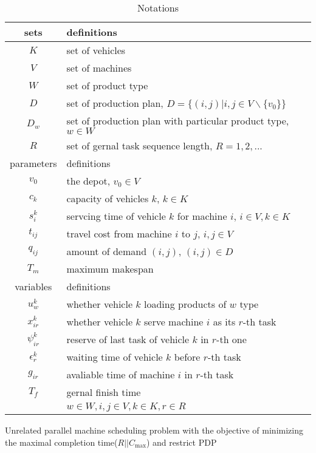 \documentclass[preprint,12pt,authoryear]{elsarticle}
\begin{document}
\begin{longtable}{cl}%
    \caption{Notations}\label{tab1}\\
    \toprule [2pt] %
    sets& definitions \\
    \midrule [1pt]  
    $K$& set of vehicles \\
    $V$& set of machines \\
    $W$& set of product type \\
    $D$& set of   production plan,
    $D=\{(i,j)|i,j\in V\backslash \{v_0\}\}$\\
    $D_w$& set of production plan with particular product type, $w \in W$ \\
    $R$& set of gernal task sequence length, $R={1,2,...}$ \\
    \midrule [1pt]     
    parameters & definitions  \\ %
    \midrule [1pt]
    $v_0$& the depot, $v_0\in V$ \\
    $c_k$& capacity of vehicles $k$, $k\in K$ \\
    $s_i^k$& servcing time of vehicle $k$ for machine $i$, $i\in V,k\in K$ \\
    $t_{ij}$& travel cost from machine $i$ to $j$, $i,j\in V$ \\ 
    $q_{ij}$& amount of demand $(i,j)$, $(i,j)\in D$ \\
    $T_m$& maximum makespan \\
    \midrule[1pt]
    variables & definitions \\
    \midrule[1pt]
    $u_w^k$& whether vehicle $k$ loading products of $w$ type \\
    $x_{ir}^k$& whether vehicle $k$ serve machine $i$ as its $r$-th task \\
    $\psi_{ir}^k$& reserve of last task of vehicle $k$ in $r$-th one \\
    $\epsilon_r^k$& waiting time of vehicle $k$ before $r$-th task \\
    $g_{ir}$& avaliable time of machine $i$ in $r$-th task \\
    $T_f$& gernal finish time \\
    & $w\in W,i,j\in V,k\in K,r\in R$\\
    \bottomrule [2pt]
\end{longtable}

Unrelated parallel machine scheduling problem with the objective of 
minimizing the maximal completion time($R||C_{\max}$) and restrict PDP
\end{document}
